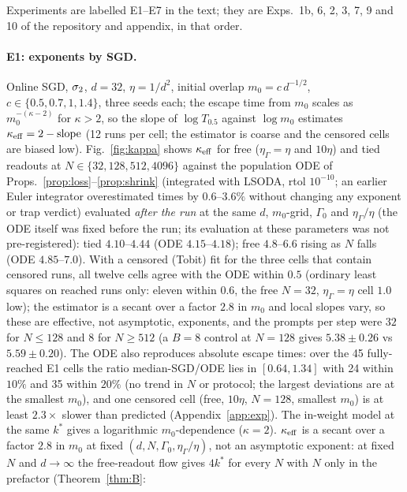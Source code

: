 Experiments are labelled E1--E7 in the text; they are Exps.~1b, 6, 2, 3, 7, 9 and 10 of the repository and appendix, in that order.

\paragraph{E1: exponents by SGD.}
Online SGD, $\sigma_2$, $d=32$, $\eta=1/d^2$, initial overlap $m_0=c\,d^{-1/2}$, $c\in\{0.5,0.7,1,1.4\}$, three seeds each; the escape
time from $m_0$ scales as $m_0^{-(\kappa-2)}$ for $\kappa>2$, so the slope of $\log T_{0.5}$ against $\log m_0$ estimates $\kappa_{\rm eff}=2-\text{slope}$
(12 runs per cell; the estimator is coarse and the censored cells are biased low). Fig.~\ref{fig:kappa} shows $\kappa_{\rm eff}$ for free
($\eta_\Gamma=\eta$ and $10\eta$) and tied readouts at $N\in\{32,128,512,4096\}$ against the population ODE of
Props.~\ref{prop:loss}--\ref{prop:shrink} (integrated with LSODA, rtol $10^{-10}$; an earlier Euler integrator overestimated times by
$0.6$--$3.6\%$ without changing any exponent or trap verdict) evaluated \emph{after the run} at the same $d$, $m_0$-grid, $\Gamma_0$ and $\eta_\Gamma/\eta$ (the ODE
itself was fixed before the run; its evaluation at these parameters was not pre-registered): tied $4.10$--$4.44$ (ODE $4.15$--$4.18$); free
$4.8$--$6.6$ rising as $N$ falls (ODE $4.85$--$7.0$). With a censored (Tobit) fit for the three cells that contain censored runs, all twelve cells agree with the ODE within $0.5$
(ordinary least squares on reached runs only: eleven within $0.6$, the free $N=32$, $\eta_\Gamma=\eta$ cell $1.0$ low); the estimator is a
secant over a factor $2.8$ in $m_0$ and local slopes vary, so these are effective, not asymptotic, exponents, and the prompts per step
were $32$ for $N\le128$ and $8$ for $N\ge512$ (a $B=8$ control at $N=128$ gives $5.38\pm0.26$ vs $5.59\pm0.20$). The ODE also
reproduces absolute escape times: over the 45 fully-reached E1 cells the ratio median-SGD/ODE lies in $[0.64,1.34]$ with 24 within
$10\%$ and 35 within $20\%$ (no trend in $N$ or protocol; the largest deviations are at the smallest $m_0$), and one censored cell
(free, $10\eta$, $N=128$, smallest $m_0$) is at least $2.3\times$ slower than predicted (Appendix~\ref{app:exp}). The
in-weight model at the same $k^*$ gives a logarithmic $m_0$-dependence ($\kappa=2$). $\kappa_{\rm eff}$ is a secant over a factor $2.8$ in $m_0$ at fixed $(d,N,\Gamma_0,\eta_\Gamma/\eta)$, not an asymptotic exponent: at fixed $N$ and
$d\to\infty$ the free-readout flow gives $4k^*$ for every $N$ with $N$ only in the prefactor (Theorem~\ref{thm:B}:
